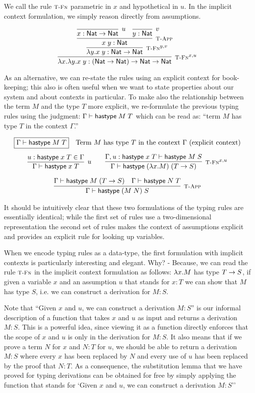 We call the rule $\textsc{\footnotesize T-Fn}$ parametric in $x$ and hypothetical in $u$.
In the implicit context formulation, we simply reason directly from
assumptions.


\[
\infer[\TFn^{x,u}]{\lam x. \lam y. x \app y : (\Nat \arrow \Nat) \arrow \Nat \arrow \Nat}
{\infer[\TFn^{y,v}]{\lam y.x \app y : \Nat \arrow \Nat}{
 \infer[\TApp]{x \app y : \Nat}
   {\infer[u]{x:\Nat \arrow \Nat}{} &
    \infer[v]{y:\Nat}{}
   }
 }
}
\]

As an alternative, we can re-state the rules using an explicit context for
book-keeping; this also is often useful when we want to state properties about
our system and about contexts in particular. To make also the
relationship between the term $M$ and the type $T$ more explicit, we
re-formulate the previous typing rules using the judgment: $\Gamma
\vdash \mathsf{hastype}\;M\;T$ which can be read as: ``term $M$ has type $T$
in the context $\Gamma$.''

\[
\begin{array}{c}
\multicolumn{1}{l}{\fbox{$\Gamma \vdash \tmhastype M
    T$}\quad\mbox{Term $M$ has type $T$ in the context $\Gamma$
    (explicit context)} }
\\[1em]
\infer[u]{\Gamma \vdash \tmhastype x T}{u:\tmhastype x T \in \Gamma} \qquad
\infer[\TFn^{x,u}]{\Gamma \vdash \tmhastype {(\lam x.M)} {(T \arrow S)}}
                 {\Gamma, u:\tmhastype x T \vdash \tmhastype M S}
\\[1em]
\infer[\TApp]{\Gamma \vdash \tmhastype {(M \app N)} S}
             {\Gamma \vdash \tmhastype M (T \arrow S)
  & \Gamma \vdash \tmhastype N T}
\end{array}
\]

It should be intuitively clear that these two formulations of the typing rules
are essentially identical; while the first set of rules use a two-dimensional
representation the second set of rules makes the context of
assumptions explicit and provides an explicit rule for looking up variables.

When we encode typing rules as a data-type, the first formulation with implicit
contexts is particularly interesting and elegant. Why? - Because, we can read the
rule $\textsc{\footnotesize T-Fn}$ in the implicit context formulation as follows: $\lambda x.M$ has type $T \rightarrow S$, if given a variable
$x$ and an assumption $u$ that stands for $x:T$ we can show that $M$ has type
$S$, i.e. we can construct a derivation for $M:S$.

Note that ``Given $x$ and $u$, we can construct a derivation $M:S$'' is our
informal description of a function that takes $x$ and $u$ as input and returns a
derivation $M:S$. This is a powerful idea, since viewing it as a function
directly enforces that the scope of $x$ and $u$ is only in the derivation for
$M:S$. It also means that if we prove a term $N$ for $x$ and $N:T$ for $u$, we
should be able to return a derivation $M:S$ where every $x$ has been replaced
by $N$ and every use of $u$ has been replaced by the proof that $N:T$. As a
consequence, the substitution lemma that we have proved for typing derivations
can be obtained for free by simply applying the function that stands for `Given
$x$ and $u$, we can construct a derivation $M:S$''


